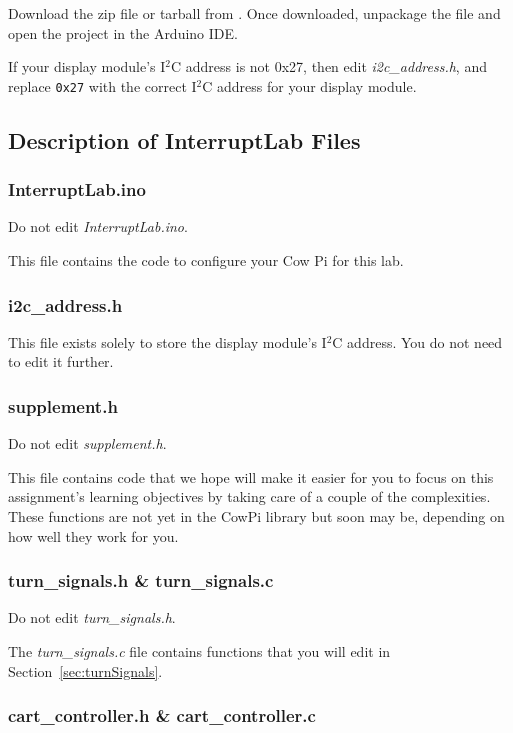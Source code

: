 Download the zip file or tarball from \filesource.
Once downloaded, unpackage the file and open the project in the Arduino IDE\@.

If your display module's I$^2$C address is not 0x27, then edit \textit{i2c\_address.h}, and replace \lstinline{0x27} with the correct I$^2$C address for your display module.

\subsection{Description of InterruptLab Files}

\subsubsection{InterruptLab.ino}

Do not edit \textit{InterruptLab.ino}.

This file contains the code to configure your Cow Pi for this lab.

\subsubsection{i2c\_address.h}

This file exists solely to store the display module's I$^2$C address.
You do not need to edit it further.

\subsubsection{supplement.h}

Do not edit \textit{supplement.h}.

This file contains code that we hope will make it easier for you to focus on this assignment's learning objectives by taking care of a couple of the complexities.
These functions are not yet in the CowPi library but soon may be, depending on how well they work for you.

\subsubsection{turn\_signals.h \& turn\_signals.c}

Do not edit \textit{turn\_signals.h}.

The \textit{turn\_signals.c} file contains functions that you will edit in Section~\ref{sec:turnSignals}.

\subsubsection{cart\_controller.h \& cart\_controller.c}

